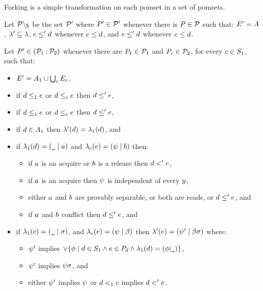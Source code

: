 Forking is %
a simple transformation on each pomset
in a set of pomsets.

\begin{definition}
Let $\mathcal{P}\setminus_{\mathsf{S}}$ be the set $\mathcal{P}'$ where $P'\in\mathcal{P}'$ whenever
there is $P\in\mathcal{P}$ such that:
$E' = A$,
$\lambda'\subseteq\lambda$,
$e\le'd$ whenever $e\le d$, and
$e\leq'd$ whenever $e\leq d$.
\end{definition}

\begin{definition}
  \label{def:semi:seq}
  Let $P' \in (\mathcal{P}_1 \mathbin; \mathcal{P}_2)$ whenever there are
  $P_1 \in \mathcal{P}_1$ and $P_{c}\in\mathcal{P}_2$, for every
  $c\in S_1$, such that:
\begin{itemize}
\item $E' = A_1 \cup \bigcup_{c}E_{c}$,
\item if $d \le_1 e$ or $d\le_{c} e$ then $d \le' e$,
\item if $d \leq_1 e$ or $d\leq_{c} e$ then $d \leq' e$,
\item if $d\in A_1$ then $\lambda'(d) = \lambda_1(d)$, and
\item if $\lambda_1(d) = (\texttt{\_} \mid a)$ and
  $\lambda_{c}(e) = (\psi \mid b)$ then:
  \begin{itemize}
  \item if $a$ is an acquire or $b$ is a release then $d <' e$,
  \item if $a$ is an acquire then $\psi$ is independent of every $y$,
  \item either $a$ and $b$ are provably separable, or both are reads, or
    $d \leq' e$, and
  \item if $a$ and $b$ conflict
    then $d \leq' e$, and
  \end{itemize}
\item 
  if
  $\lambda_1(c) = (\texttt{\_} \mid \sigma)$, and
  $\lambda_{c}(e) = (\psi \mid \beta)$ then
  $\lambda'(e) = (\psi' \mid \beta\sigma)$ where:
  \begin{itemize}
  \item $\psi'$ implies
    $\lor\{\phi\mid d\in S_1 \land e\in P\!_{d}
    \land \lambda_1(d)=(\phi{\mid}\texttt{\_})\}$,
  \item $\psi'$ implies $\psi\sigma$, and
  \item either $\psi'$ implies $\psi$ or $d<_1c$ implies $d<'e$.
  \end{itemize}
\end{itemize}
\end{definition}


